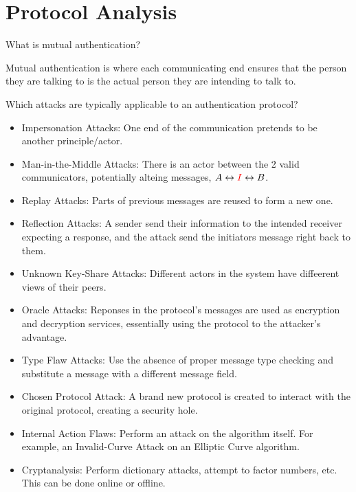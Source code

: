 \section{Protocol Analysis}\label{sec:Protocol_Analysis}
\begin{questions}
\question{} What is mutual authentication?
  \begin{solution}
    Mutual authentication is where each communicating end ensures that the person they are talking to is the actual person they are intending to talk to.
  \end{solution}

\question{} Which attacks are typically applicable to an authentication protocol?
  \begin{solution}
    \begin{itemize}[noitemsep]
    \item Impersonation Attacks: One end of the communication pretends to be another principle/actor.
    \item Man-in-the-Middle Attacks: There is an actor between the 2 valid communicators, potentially alteing messages, $A \leftrightarrow \textcolor{red}{I} \leftrightarrow B$.
    \item Replay Attacks: Parts of previous messages are reused to form a new one.
    \item Reflection Attacks: A sender send their information to the intended receiver expecting a response, and the attack send the initiators message right back to them.
    \item Unknown Key-Share Attacks: Different actors in the system have diffeerent views of their peers.
    \item Oracle Attacks: Reponses in the protocol's messages are used as encryption and decryption services, essentially using the protocol to the attacker's advantage.
    \item Type Flaw Attacks: Use the absence of proper message type checking and substitute a message with a different message field.
    \item Chosen Protocol Attack: A brand new protocol is created to interact with the original protocol, creating a security hole.
    \item Internal Action Flaws: Perform an attack on the algorithm itself.
      For example, an Invalid-Curve Attack on an Elliptic Curve algorithm.
    \item Cryptanalysis: Perform dictionary attacks, attempt to factor numbers, etc. This can be done online or offline.
    \end{itemize}
  \end{solution}


\end{questions}
